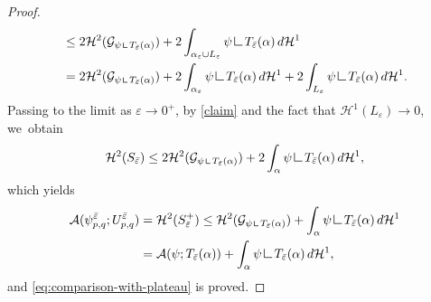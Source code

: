 \documentclass[11pt]{article}
\numberwithin{equation}{section}
\let\eps\varepsilon
\newcommand{\resa}{\mathop{\hbox{\vrule height 7pt width 0.5pt depth 0pt
\vrule height 0.5pt width 6pt depth 0pt}}\nolimits}
\newcommand{\resb}{\mathop{\hbox{\vrule height 4pt width 0.5pt depth 0pt
\vrule height 0.5pt width 3pt depth 0pt}}\nolimits}
\newcommand{\res}{\mathchoice{\resa}{\resa}{\resb}{\resb}}
\theoremstyle{definition}
\begin{document}
\begin{proof}
\begin{equation*}
\begin{split}
&\le 2\mathcal{H}^2(\mathcal{G}_{\psi\res T_{\bar\eps}(\alpha)}) +
2\int_{\alpha_\eps\cup L_\eps}\psi\res{T_{\bar\eps}(\alpha)}\, d\mathcal{H}^1\\
&= 2\mathcal{H}^2(\mathcal{G}_{\psi\res T_{\bar\eps}(\alpha)}) + 2\int_{\alpha_\eps}\psi\res{T_{\bar\eps}(\alpha)}\, d\mathcal{H}^1+
2\int_{ L_\eps}\psi\res{T_{\bar\eps}(\alpha)}\,d\mathcal{H}^1.
\end{split}
\end{equation*}
Passing to the limit as $\eps\to0^+$, by \eqref{claim} and the fact that $\mathcal{H}^1(L_\eps)\to0$, we~obtain
\begin{equation*}
\mathcal{H}^2(S_{\bar\eps})\le
2\mathcal{H}^2(\mathcal{G}_{\psi\res T_{\bar\eps}(\alpha)}) +
2\int_{\alpha}\psi\res{T_{\bar\eps}(\alpha)} \,d\mathcal{H}^1,
\end{equation*}
which yields
\begin{align*}
\mathcal{A}(\psi_{p,q}^{\bar\eps};U_{p,q}^{\bar\eps})&=
\mathcal{H}^2(S_{\bar\eps}^+)\le
\mathcal{H}^2(\mathcal{G}_{\psi\res T_{\bar\eps}(\alpha)}) +
\int_{\alpha}\psi\res{T_{\bar\eps}(\alpha)}\,d\mathcal{H}^1\\
&=\mathcal{A}(\psi; T_{\bar\eps}(\alpha))+
\int_{\alpha}\psi\res{T_{\bar\eps}(\alpha)}\,d\mathcal{H}^1,
\end{align*}
and \eqref{eq:comparison-with-plateau} is proved.


\end{proof}
\end{document}
